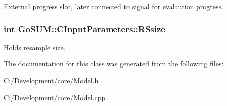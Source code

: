 External progress slot, later connected to signal for evalaution progress. 

\hypertarget{class_go_s_u_m_1_1_c_input_parameters_ad33f3fe5498287609093ca480c221458}{
\subsubsection[{R\-Ssize}]{\setlength{\rightskip}{0pt plus 5cm}int Go\-S\-U\-M\-::\-C\-Input\-Parameters\-::\-R\-Ssize\hspace{0.3cm}{\ttfamily [private]}}}\label{class_go_s_u_m_1_1_c_input_parameters_ad33f3fe5498287609093ca480c221458}
Holds resample size. 

The documentation for this class was generated from the following files\-:\begin{DoxyCompactItemize}
\item 
C\-:/\-Development/core/\hyperlink{_model_8h}{Model.\-h}\item 
C\-:/\-Development/core/\hyperlink{_model_8cpp}{Model.\-cpp}\end{DoxyCompactItemize}
